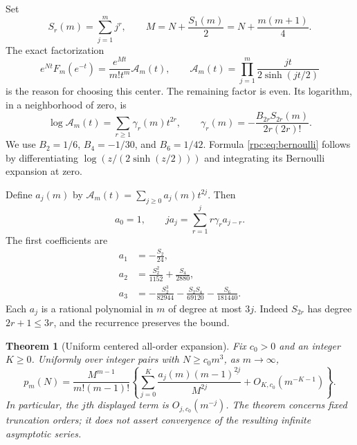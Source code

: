 \documentclass[11pt]{article}
\newtheorem{theorem}{Theorem}[section]
\theoremstyle{definition}
\theoremstyle{remark}
\newcommand{\fall}[2]{#1^{\underline{#2}}}
\numberwithin{equation}{section}
\begin{document}
Set
\begin{equation}\label{rpc:eq:center}
 S_r(m)=\sum_{j=1}^m j^r,\qquad
 M=N+\frac{S_1(m)}2=N+\frac{m(m+1)}4.
\end{equation}
The exact factorization
\begin{equation}\label{rpc:eq:factor}
 e^{Nt}F_m(e^{-t})=
 \frac{e^{Mt}}{m!t^m}\mathcal A_m(t),\qquad
 \mathcal A_m(t)=\prod_{j=1}^m\frac{jt}{2\sinh(jt/2)}
\end{equation}
is the reason for choosing this center. The remaining factor is even. Its
logarithm, in a neighborhood of zero, is
\begin{equation}\label{rpc:eq:bernoulli}
 \log\mathcal A_m(t)=\sum_{r\ge1}\gamma_r(m)t^{2r},\qquad
 \gamma_r(m)=-\frac{B_{2r}S_{2r}(m)}{2r(2r)!}.
\end{equation}
We use $B_2=1/6$, $B_4=-1/30$, and $B_6=1/42$. Formula
\eqref{rpc:eq:bernoulli} follows by differentiating
$\log(z/(2\sinh(z/2)))$ and integrating its Bernoulli expansion at zero.

Define $a_j(m)$ by $\mathcal A_m(t)=\sum_{j\ge0}a_j(m)t^{2j}$. Then
\begin{equation}\label{rpc:eq:a-rec}
 a_0=1,\qquad
 j a_j=\sum_{r=1}^j r\gamma_r a_{j-r}.
\end{equation}
The first coefficients are
\begin{align}
 a_1&=-\frac{S_2}{24},\label{rpc:eq:a1}\\
 a_2&=\frac{S_2^2}{1152}+\frac{S_4}{2880},\\
 a_3&=-\frac{S_2^3}{82944}-\frac{S_2S_4}{69120}
                         -\frac{S_6}{181440}.
\end{align}
Each $a_j$ is a rational polynomial in $m$ of degree at most $3j$.
Indeed $S_{2r}$ has degree $2r+1\le3r$, and the recurrence preserves the bound.

\begin{theorem}[Uniform centered all-order expansion]\label{rpc:thm:centered}
Fix $c_0>0$ and an integer $K\ge0$. Uniformly over integer pairs with
$N\ge c_0m^3$, as $m\to\infty$,
\begin{equation}\label{rpc:eq:centered}
 p_m(N)=\frac{M^{m-1}}{m!(m-1)!}
 \left\{\sum_{j=0}^K
  \frac{a_j(m)\fall{(m-1)}{2j}}{M^{2j}}
       +O_{K,c_0}(m^{-K-1})\right\}.
\end{equation}
In particular, the $j$th displayed term is $O_{j,c_0}(m^{-j})$.
The theorem concerns fixed truncation orders; it does not assert convergence
of the resulting infinite asymptotic series.
\end{theorem}
\end{document}
